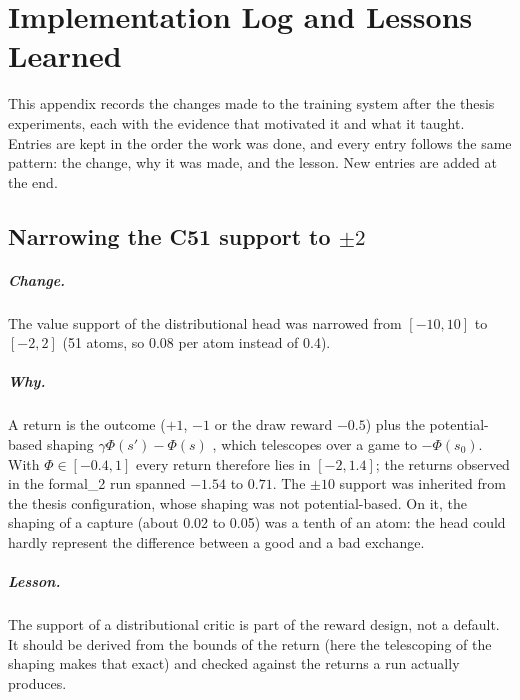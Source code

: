 \chapter{Implementation Log and Lessons Learned}
\renewcommand{\thefigure}{C.\arabic{figure}}
\renewcommand{\thetable}{C.\arabic{table}}
\label{app:lessons}

This appendix records the changes made to the training system after the thesis experiments,
each with the evidence that motivated it and what it taught. Entries are kept in the order the
work was done, and every entry follows the same pattern: the change, why it was made, and the
lesson. New entries are added at the end.

\section{Narrowing the C51 support to $\pm 2$}

\paragraph{Change.} The value support of the distributional head \cite{C51} was narrowed from
$[-10, 10]$ to $[-2, 2]$ (51 atoms, so 0.08 per atom instead of 0.4).

\paragraph{Why.} A return is the outcome ($+1$, $-1$ or the draw reward $-0.5$) plus the
potential-based shaping $\gamma\Phi(s') - \Phi(s)$ \cite{NgPBRS}, which telescopes over a game to
$-\Phi(s_0)$. With $\Phi \in [-0.4, 1]$ every return therefore lies in $[-2, 1.4]$; the returns
observed in the formal\_2 run spanned $-1.54$ to $0.71$. The $\pm 10$ support was inherited from
the thesis configuration, whose shaping was not potential-based. On it, the shaping of a capture
(about 0.02 to 0.05) was a tenth of an atom: the head could hardly represent the difference
between a good and a bad exchange.

\paragraph{Lesson.} The support of a distributional critic is part of the reward design, not a
default. It should be derived from the bounds of the return (here the telescoping of the
shaping makes that exact) and checked against the returns a run actually produces.

